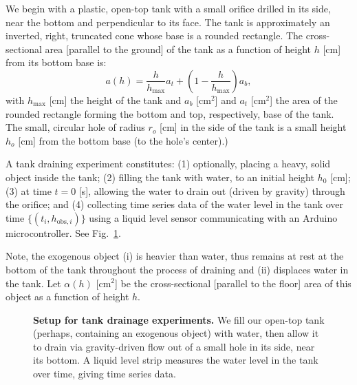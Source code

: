 \documentclass[openacc]{rsproca_new}%
\begin{document}
We begin with a plastic, open-top tank with a small orifice drilled in its side, near the bottom and perpendicular to its face.
The tank is approximately an inverted, right, truncated cone whose base is a rounded rectangle. The cross-sectional area [parallel to the ground] of the tank as a function of height $h$ [cm] from its bottom base is:
\begin{equation}
	a(h) = \frac{h}{h_{\text{max}}}a_t + \left(1-\frac{h}{h_{\text{max}}}\right) a_b, \label{eq:a_of_h}
\end{equation}
with $h_{\text{max}}$ [cm] the height of the tank and $a_b$ [cm$^2$] and $a_t$ [cm$^2$] the area of the rounded rectangle forming the bottom and top, respectively, base of the tank.
The small, circular hole of radius $r_o$ [cm] in the side of the tank is a small height $h_o$ [cm] from the bottom base (to the hole's center).)

A tank draining experiment constitutes: (1) optionally, placing a heavy, solid object inside the tank; (2) filling the tank with water, to an initial height $h_0$ [cm]; (3) at time $t=0$ [s], allowing the water to drain out (driven by gravity) through the orifice; and (4) collecting time series data of the water level in the tank over time $\{(t_i, h_{\text{obs}, i}) \}$ using a liquid level sensor communicating with an Arduino microcontroller. See Fig.~\ref{fig:photo_of_tank}.

Note, the exogenous object (i) is heavier than water, thus remains at rest at the bottom of the tank throughout the process of draining and (ii) displaces water in the tank.
Let $\alpha(h)$ [cm$^2$] be the cross-sectional [parallel to the floor] area of this object as a function of height $h$.

\begin{figure}[h!]
\begin{center}
	\caption{\textbf{Setup for tank drainage experiments.}
	We fill our open-top tank (perhaps, containing an exogenous object) with water, then allow it to drain via gravity-driven flow out of a small hole in its side, near its bottom. A liquid level strip measures the water level in the tank over time, giving time series data.
	}
	\label{fig:photo_of_tank}
\end{center}
\end{figure}
\end{document}
